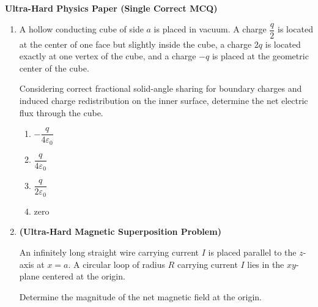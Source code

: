 \documentclass[12pt]{article}
\begin{document}
\begin{center}
\Large \textbf{Ultra-Hard Physics Paper (Single Correct MCQ)}
\end{center}

\vspace{0.5cm}

\begin{enumerate}

\item
A hollow conducting cube of side $a$ is placed in vacuum. 
A charge $\dfrac{q}{2}$ is located at the center of one face but slightly inside the cube, 
a charge $2q$ is located exactly at one vertex of the cube, 
and a charge $-q$ is placed at the geometric center of the cube. 

Considering correct fractional solid-angle sharing for boundary charges and induced charge redistribution on the inner surface, determine the net electric flux through the cube.

\begin{enumerate}
\item $-\dfrac{q}{4\varepsilon_0}$
\item $\dfrac{q}{4\varepsilon_0}$
\item $\dfrac{q}{2\varepsilon_0}$
\item zero
\end{enumerate}
\item
\textbf{(Ultra-Hard Magnetic Superposition Problem)}

An infinitely long straight wire carrying current $I$ is placed parallel to the $z$-axis at $x=a$.  
A circular loop of radius $R$ carrying current $I$ lies in the $xy$-plane centered at the origin.  

Determine the magnitude of the net magnetic field at the origin.

\begin{center}
\end{center}
\end{enumerate}
\end{document}

